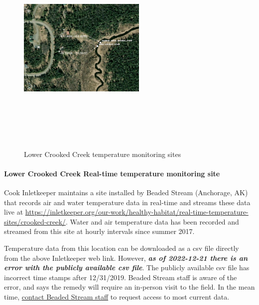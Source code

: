 \documentclass[
  letterpaper,
  DIV=11,
  numbers=noendperiod]{scrreprt}
\let\oldparagraph\paragraph
\renewcommand{\paragraph}[1]{\oldparagraph{#1}\mbox{}}
\begin{document}
\begin{figure}

{\centering \includegraphics[width=2.41in,height=4.16667in]{./images/lower_crooked_creek_temp_logger_map.png}

}

\caption{\label{fig-cc-map}Lower Crooked Creek temperature monitoring
sites}

\end{figure}

\hypertarget{lower-crooked-creek-real-time-temperature-monitoring-site}{%
\paragraph{Lower Crooked Creek Real-time temperature monitoring
site}\label{lower-crooked-creek-real-time-temperature-monitoring-site}}

Cook Inletkeeper maintains a site installed by Beaded Stream (Anchorage,
AK) that records air and water temperature data in real-time and streams
these data live at
\url{https://inletkeeper.org/our-work/healthy-habitat/real-time-temperature-sites/crooked-creek/}.
Water and air temperature data has been recorded and streamed from this
site at hourly intervals since summer 2017.

Temperature data from this location can be downloaded as a csv file
directly from the above Inletkeeper web link. However, \textbf{\emph{as
of 2022-12-21 there is an error with the publicly available csv file}}.
The publicly available csv file has incorrect time stamps after
12/31/2019. Beaded Stream staff is aware of the error, and says the
remedy will require an in-person visit to the field. In the mean time,
\href{http://www.beadedstream.com/contact/}{contact Beaded Stream staff}
to request access to most current data.
\end{document}
